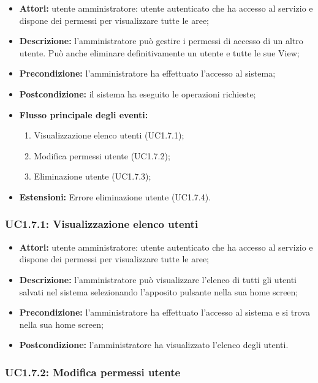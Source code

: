 \begin{itemize}
    \item \textbf{Attori:} utente amministratore: utente autenticato che ha accesso al servizio e dispone dei permessi per visualizzare tutte le aree;
    \item \textbf{Descrizione:} l'amministratore può gestire i permessi di accesso di un altro utente. Può anche eliminare definitivamente un utente e tutte le sue View;
    \item \textbf{Precondizione:} l'amministratore ha effettuato l'accesso al sistema;
    \item \textbf{Postcondizione:} il sistema ha eseguito le operazioni richieste;
    \item \textbf{Flusso principale degli eventi:}
    \begin{enumerate}
        \item Visualizzazione elenco utenti (UC1.7.1);
        \item Modifica permessi utente (UC1.7.2);
        \item Eliminazione utente (UC1.7.3);
    \end{enumerate}
    \item \textbf{Estensioni:} Errore eliminazione utente (UC1.7.4).
\end{itemize}

\subsubsection{UC1.7.1: Visualizzazione elenco utenti}

\begin{itemize}
    \item \textbf{Attori:} utente amministratore: utente autenticato che ha accesso al servizio e dispone dei permessi per visualizzare tutte le aree;
    \item \textbf{Descrizione:} l'amministratore può visualizzare l'elenco di tutti gli utenti salvati nel sistema selezionando l'apposito pulsante nella sua home screen;
    \item \textbf{Precondizione:} l'amministratore ha effettuato l'accesso al sistema e si trova nella sua home screen;
    \item \textbf{Postcondizione:} l'amministratore ha visualizzato l'elenco degli utenti.
\end{itemize}

\subsubsection{UC1.7.2: Modifica permessi utente}

